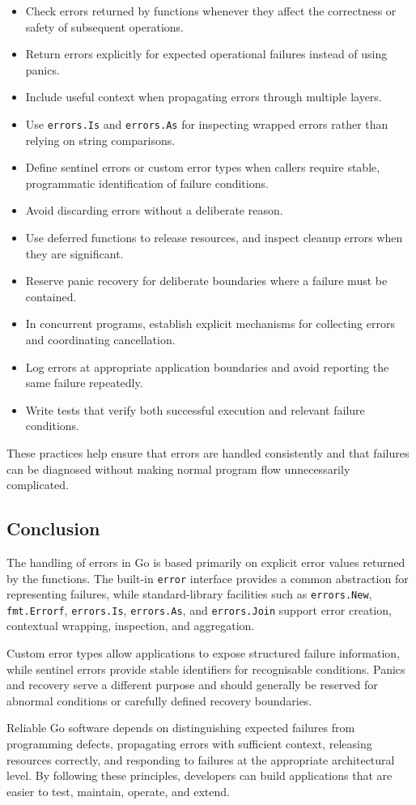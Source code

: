 \begin{itemize}
    \item Check errors returned by functions whenever they affect the correctness or safety of subsequent operations.
    \item Return errors explicitly for expected operational failures instead of using panics.
    \item Include useful context when propagating errors through multiple layers.
    \item Use \texttt{errors.Is} and \texttt{errors.As} for inspecting wrapped errors rather than relying on string comparisons.
    \item Define sentinel errors or custom error types when callers require stable, programmatic identification of failure conditions.
    \item Avoid discarding errors without a deliberate reason.
    \item Use deferred functions to release resources, and inspect cleanup errors when they are significant.
    \item Reserve panic recovery for deliberate boundaries where a failure must be contained.
    \item In concurrent programs, establish explicit mechanisms for collecting errors and coordinating cancellation.
    \item Log errors at appropriate application boundaries and avoid reporting the same failure repeatedly.
    \item Write tests that verify both successful execution and relevant failure conditions.
\end{itemize}

These practices help ensure that errors are handled consistently and that failures can be diagnosed without making normal program flow unnecessarily complicated.

\subsection{Conclusion}

The handling of errors in Go is based primarily on explicit error values returned by the functions. The built-in \texttt{error} interface provides a common abstraction for representing failures, while standard-library facilities such as \texttt{errors.New}, \texttt{fmt.Errorf}, \texttt{errors.Is}, \texttt{errors.As}, and \texttt{errors.Join} support error creation, contextual wrapping, inspection, and aggregation.

Custom error types allow applications to expose structured failure information, while sentinel errors provide stable identifiers for recognisable conditions. Panics and recovery serve a different purpose and should generally be reserved for abnormal conditions or carefully defined recovery boundaries.

Reliable Go software depends on distinguishing expected failures from programming defects, propagating errors with sufficient context, releasing resources correctly, and responding to failures at the appropriate architectural level. By following these principles, developers can build applications that are easier to test, maintain, operate, and extend.

